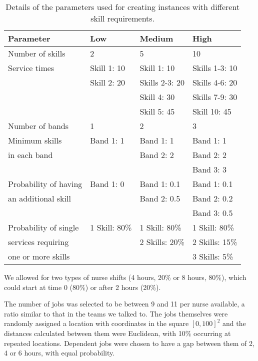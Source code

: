 \begin{table}[htbp!]
	\centering
	\caption{Details of the parameters used for creating instances with different skill requirements.}
	\begin{tabular}{|l|l|l|l|}
	\hline
		\textbf{Parameter} & \textbf{Low} & \textbf{Medium} & \textbf{High} \\
		\hline
		Number of skills   &  2 & 5 & 10\\ \hline
		Service times   &  Skill 1: 10 & Skill 1: 10 &Skills 1-3: 10\\
						&  Skill 2: 20 & Skills 2-3: 20 & Skills 4-6: 20 \\
						&  			   & Skill 4: 30 & Skills 7-9: 30 \\
						&  			   & Skill 5: 45 & Skill 10: 45 \\ \hline
		Number of bands & 1 & 2 & 3 \\ \hline
		Minimum skills & Band 1: 1 & Band 1: 1 & Band 1: 1 \\
		in each band  & 			 & Band 2: 2 & Band 2: 2 \\
										& 			 &  & Band 3: 3 \\ \hline
		Probability of having & Band 1: 0 & Band 1: 0.1 & Band 1: 0.1 \\
		an additional skill  & 			 & Band 2: 0.5 & Band 2: 0.2 \\
										& 			 &  & Band 3: 0.5 \\ \hline
		Probability of single & 1 Skill: 80\% & 1 Skill: 80\% & 1 Skill: 80\% \\		
		services requiring 	 & 				 & 2 Skills: 20\% & 2 Skills: 15\% \\		
		one or more skills   & 				 & & 3 Skills: 5\% \\ \hline
	\end{tabular}\label{appendix:table:skillmixconfiguration}
\end{table}

We allowed for two types of nurse shifts (4 hours, 20\% or 8 hours, 80\%), which could start at time 0 (80\%) or after 2 hours (20\%).


The number of jobs was selected to be between 9 and 11 per nurse available, a ratio similar to that in the teams we talked to. The jobs themselves were randomly assigned a location with coordinates in the square $[0, 100]^2$ and the distances calculated between them were Euclidean, with 10\% occurring at repeated locations. Dependent jobs were chosen to have a gap between them of 2, 4 or 6 hours, with equal probability.

